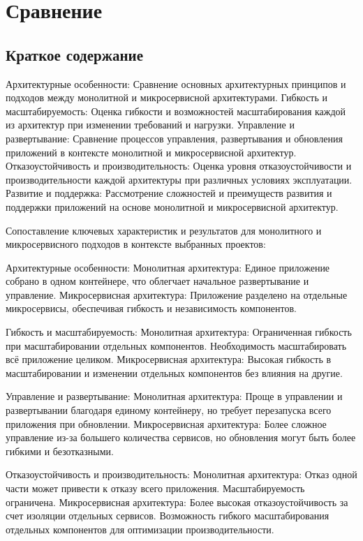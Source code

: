 \section{Сравнение}

\subsection{Краткое содержание}
    Архитектурные особенности: Сравнение основных архитектурных принципов и подходов между монолитной и микросервисной архитектурами.
    Гибкость и масштабируемость: Оценка гибкости и возможностей масштабирования каждой из архитектур при изменении требований и нагрузки.
    Управление и развертывание: Сравнение процессов управления, развертывания и обновления приложений в контексте монолитной и микросервисной архитектур.
    Отказоустойчивость и производительность: Оценка уровня отказоустойчивости и производительности каждой архитектуры при различных условиях эксплуатации.
    Развитие и поддержка: Рассмотрение сложностей и преимуществ развития и поддержки приложений на основе монолитной и микросервисной архитектур.

    Сопоставление ключевых характеристик и результатов для монолитного и микросервисного подходов в контексте выбранных проектов:

    Архитектурные особенности:
        Монолитная архитектура: Единое приложение собрано в одном контейнере, что облегчает начальное развертывание и управление.
        Микросервисная архитектура: Приложение разделено на отдельные микросервисы, обеспечивая гибкость и независимость компонентов.

    Гибкость и масштабируемость:
        Монолитная архитектура: Ограниченная гибкость при масштабировании отдельных компонентов. Необходимость масштабировать всё приложение целиком.
        Микросервисная архитектура: Высокая гибкость в масштабировании и изменении отдельных компонентов без влияния на другие.

    Управление и развертывание:
        Монолитная архитектура: Проще в управлении и развертывании благодаря единому контейнеру, но требует перезапуска всего приложения при обновлении.
        Микросервисная архитектура: Более сложное управление из-за большего количества сервисов, но обновления могут быть более гибкими и безотказными.

    Отказоустойчивость и производительность:
        Монолитная архитектура: Отказ одной части может привести к отказу всего приложения. Масштабируемость ограничена.
        Микросервисная архитектура: Более высокая отказоустойчивость за счет изоляции отдельных сервисов. Возможность гибкого масштабирования отдельных компонентов для оптимизации производительности.

